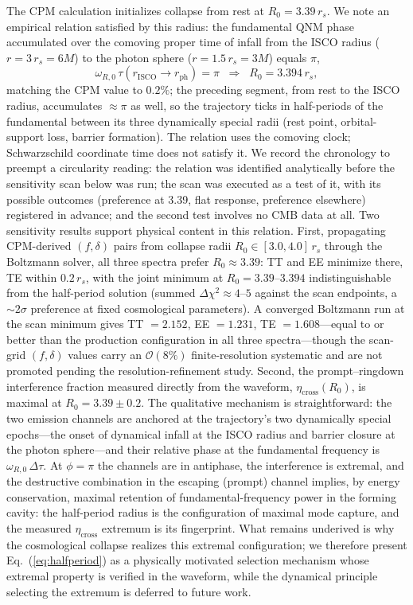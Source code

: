 \documentclass[aps,prd,twocolumn,superscriptaddress,showpacs,preprintnumbers,amsmath,amssymb,nofootinbib]{revtex4-2}
\begin{document}
The CPM calculation initializes collapse from rest at $R_0 = 3.39\,r_s$. We note an empirical relation satisfied by this radius: the fundamental QNM phase accumulated over the comoving proper time of infall from the ISCO radius ($r = 3\,r_s = 6M$) to the photon sphere ($r = 1.5\,r_s = 3M$) equals $\pi$,
\begin{equation}
\omega_{R,0}\,\tau(r_\mathrm{ISCO} \to r_\mathrm{ph}) = \pi \;\;\Rightarrow\;\; R_0 = 3.394\,r_s,
\label{eq:halfperiod}
\end{equation}
matching the CPM value to $0.2\%$; the preceding segment, from rest to the ISCO radius, accumulates $\approx \pi$ as well, so the trajectory ticks in half-periods of the fundamental between its three dynamically special radii (rest point, orbital-support loss, barrier formation). The relation uses the comoving clock; Schwarzschild coordinate time does not satisfy it. We record the chronology to preempt a circularity reading: the relation was identified analytically before the sensitivity scan below was run; the scan was executed as a test of it, with its possible outcomes (preference at 3.39, flat response, preference elsewhere) registered in advance; and the second test involves no CMB data at all. Two sensitivity results support physical content in this relation. First, propagating CPM-derived $(f, \delta)$ pairs from collapse radii $R_0 \in [3.0, 4.0]\,r_s$ through the Boltzmann solver, all three spectra prefer $R_0 \approx 3.39$: TT and EE minimize there, TE within $0.2\,r_s$, with the joint minimum at $R_0 = 3.39$--$3.394$ indistinguishable from the half-period solution (summed $\Delta\chi^2 \approx 4$--$5$ against the scan endpoints, a $\sim 2\sigma$ preference at fixed cosmological parameters). A converged Boltzmann run at the scan minimum gives TT $= 2.152$, EE $= 1.231$, TE $= 1.608$---equal to or better than the production configuration in all three spectra---though the scan-grid $(f, \delta)$ values carry an $\mathcal{O}(8\%)$ finite-resolution systematic and are not promoted pending the resolution-refinement study. Second, the prompt--ringdown interference fraction measured directly from the waveform, $\eta_\mathrm{cross}(R_0)$, is maximal at $R_0 = 3.39 \pm 0.2$. The qualitative mechanism is straightforward: the two emission channels are anchored at the trajectory's two dynamically special epochs---the onset of dynamical infall at the ISCO radius and barrier closure at the photon sphere---and their relative phase at the fundamental frequency is $\omega_{R,0}\,\Delta\tau$. At $\phi = \pi$ the channels are in antiphase, the interference is extremal, and the destructive combination in the escaping (prompt) channel implies, by energy conservation, maximal retention of fundamental-frequency power in the forming cavity: the half-period radius is the configuration of maximal mode capture, and the measured $\eta_\mathrm{cross}$ extremum is its fingerprint. What remains underived is why the cosmological collapse realizes this extremal configuration; we therefore present Eq.~(\ref{eq:halfperiod}) as a physically motivated selection mechanism whose extremal property is verified in the waveform, while the dynamical principle selecting the extremum is deferred to future work.
\end{document}
